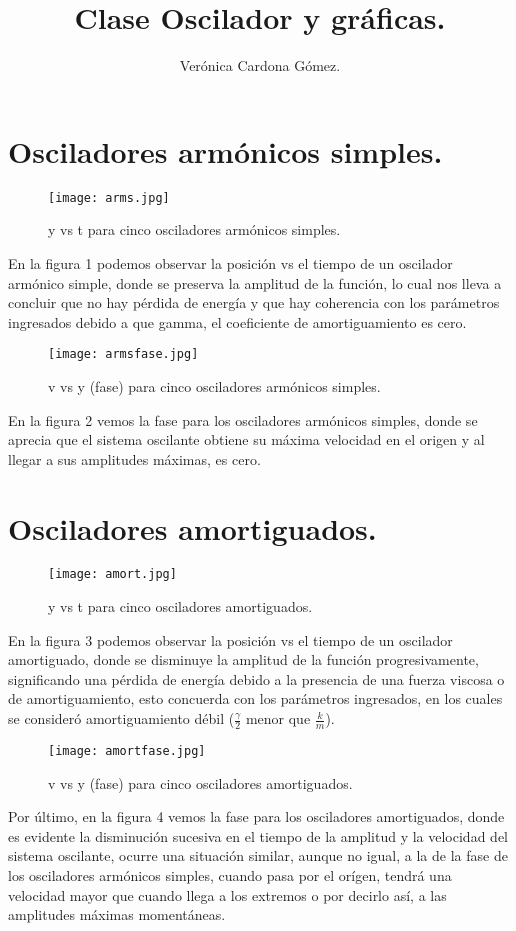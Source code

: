 \documentclass[a4paper]{article}
\title{Clase Oscilador y gráficas.}
\author{Verónica Cardona Gómez.}
\affil[*]{\underline{veronica.cardonag1@udea.edu.co}}
\begin{document}
\maketitle

\section{Osciladores armónicos simples.}

\begin{figure}[H]
\centering
\texttt{[image: arms.jpg]}
\caption{\label{fig1} y vs t para cinco osciladores armónicos simples.}
\end{figure}

En la figura 1 podemos observar la posición vs el tiempo de un oscilador armónico simple, donde se preserva la amplitud de la función, lo cual nos lleva a concluir que no hay pérdida de energía y que hay coherencia con los parámetros ingresados debido a que gamma, el coeficiente de amortiguamiento es cero.


\begin{figure}[H]
\centering
\texttt{[image: armsfase.jpg]}
\caption{\label{fig1} v vs y (fase) para cinco osciladores armónicos simples.}
\end{figure}

En la figura 2 vemos la fase para los osciladores armónicos simples, donde se aprecia que el sistema oscilante obtiene su máxima velocidad en el origen y al llegar a sus amplitudes máximas, es cero.

\section{Osciladores amortiguados.}

\begin{figure}[H]
\centering
\texttt{[image: amort.jpg]}
\caption{\label{fig1} y vs t para cinco osciladores amortiguados.}
\end{figure}

En la figura 3 podemos observar la posición vs el tiempo de un oscilador amortiguado, donde se disminuye la amplitud de la función progresivamente, significando una pérdida de energía debido a la presencia de una fuerza viscosa o de amortiguamiento, esto concuerda con los parámetros ingresados, en los cuales se consideró amortiguamiento débil ($\frac{\gamma}{2}$ menor que $\frac{k}{m}$).

\begin{figure}[H]
\centering
\texttt{[image: amortfase.jpg]}
\caption{\label{fig1} v vs y (fase) para cinco osciladores amortiguados.}
\end{figure}

Por último, en la figura 4 vemos la fase para los osciladores amortiguados, donde es evidente la disminución sucesiva en el tiempo de la amplitud y la velocidad del sistema oscilante, ocurre una situación similar, aunque no igual, a la de la fase de los osciladores armónicos simples, cuando pasa por el orígen, tendrá una velocidad mayor que cuando llega a los extremos o por decirlo así, a las amplitudes máximas momentáneas.
\end{document}
